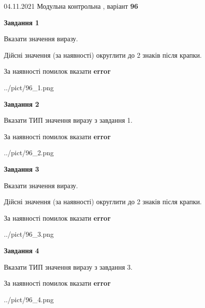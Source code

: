 \documentclass[11pt, ukrainian]{article}
\begin{document}
{04.11.2021 Модульна контрольна , варіант  \No \textbf { 96 }\par}
{
\begin {large}
{\begin {center}\textbf{Завдання 1}\end {center}}\par
Вказати значення виразу. \par
Дійсні значення (за наявності) округлити до 2 знаків після крапки. \par
За наявності помилок вказати \textbf{error}

\begin{center}
	{../pict/96_1.png}
\end{center}
\newpage

{\begin {center}\textbf{Завдання 2}\end {center}}\par
Вказати ТИП значення виразу з завдання 1. \par
За наявності помилок вказати \textbf{error}

\begin{center}
	{../pict/96_2.png}
\end{center}
\newpage

{\begin {center}\textbf{Завдання 3}\end {center}}\par
Вказати значення виразу. \par
Дійсні значення (за наявності) округлити до 2 знаків після крапки. \par
За наявності помилок вказати \textbf{error}

\begin{center}
	{../pict/96_3.png}
\end{center}
\newpage

{\begin {center}\textbf{Завдання 4}\end {center}}\par
Вказати ТИП значення виразу з завдання 3. \par
За наявності помилок вказати \textbf{error}

\begin{center}
	{../pict/96_4.png}
\end{center}
\newpage


\end{large}}
\end{document}
